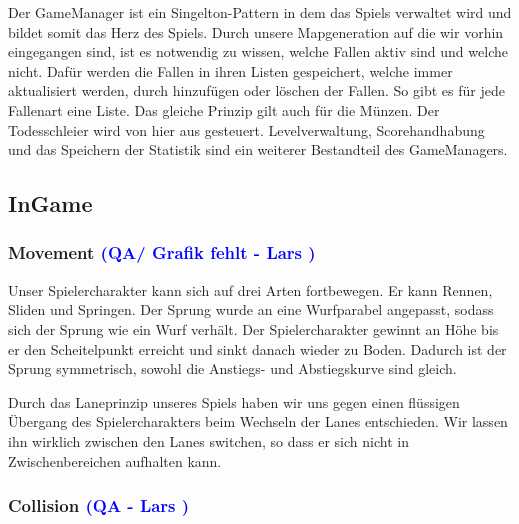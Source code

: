 \documentclass[12pt]{article}
\begin{document}
\noindent Der GameManager ist ein Singelton-Pattern in dem das Spiels verwaltet wird und bildet somit das Herz des Spiels. Durch unsere Mapgeneration auf die wir
vorhin eingegangen sind, ist es notwendig zu wissen, welche Fallen aktiv sind und welche nicht. Dafür werden die Fallen in ihren Listen gespeichert, welche
immer aktualisiert werden, durch hinzufügen oder löschen der Fallen. So gibt es für jede Fallenart eine Liste. Das gleiche Prinzip gilt auch für die Münzen.
Der Todesschleier wird von hier aus gesteuert. Levelverwaltung, Scorehandhabung und das Speichern der Statistik sind ein weiterer Bestandteil des GameManagers.

\vspace{2cm}
\subsection{InGame}

\vspace{1cm}
\subsubsection{Movement \textcolor{blue}{(QA/ Grafik fehlt - Lars )}}

Unser Spielercharakter kann sich auf drei Arten fortbewegen. Er kann Rennen, Sliden und Springen. Der Sprung wurde an eine
Wurfparabel angepasst, sodass sich der Sprung wie ein Wurf verhält. Der Spielercharakter gewinnt an Höhe bis er den Scheitelpunkt
erreicht und sinkt danach wieder zu Boden. Dadurch ist der Sprung symmetrisch, sowohl die Anstiegs- und Abstiegskurve sind gleich.


\noindent Durch das Laneprinzip unseres Spiels haben wir uns gegen einen flüssigen Übergang des Spielercharakters beim Wechseln der Lanes
entschieden. Wir lassen ihn wirklich zwischen den Lanes switchen, so dass er sich nicht in Zwischenbereichen aufhalten kann.

\vspace{1cm}
\subsubsection{Collision \textcolor{blue}{(QA - Lars )}}

\end{document}
